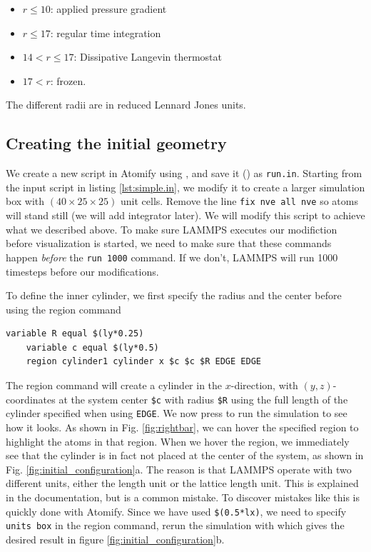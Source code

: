 \documentclass[aps,pre,twocolumn,letterpaper,floatfix,nofootinbib]{revtex4}
\newcommand{\code}[1]{\colorbox{light-gray}{\color{RawSienna}\texttt{#1}}}
\begin{document}
\begin{itemize}  
	\item $r \leq 10$: applied pressure gradient
	\item $r \leq 17$: regular time integration
	\item $14 < r \leq 17$: Dissipative Langevin thermostat
	\item $17 < r$: frozen.
\end{itemize}
The different radii are in reduced Lennard Jones units.

\subsection{Creating the initial geometry}
We create a new script in Atomify using , and save it () as \code{run.in}.
Starting from the input script in listing \ref{lst:simple.in}, we modify it to create a larger simulation box with $(40\times25\times25)$ unit cells.
Remove the line \code{fix nve all nve} so atoms will stand still (we will add integrator later).
We will modify this script to achieve what we described above. To make sure LAMMPS executes our modifiction before visualization is started, we need to make sure that these commands happen \textit{before} the \code{run 1000} command.
If we don't, LAMMPS will run 1000 timesteps before our modifications.

To define the inner cylinder, we first specify the radius and the center before using the region command
\begin{lstlisting}[basicstyle=\tiny, frame = none, numbers=none, framexleftmargin=0pt, xleftmargin=-0.75cm, xrightmargin=0.0cm]
	variable R equal $(ly*0.25)
	variable c equal $(ly*0.5)
	region cylinder1 cylinder x $c $c $R EDGE EDGE
\end{lstlisting}
The region command will create a cylinder in the $x$-direction, with $(y,z)$-coordinates at the system center \code{\$c} with radius \code{\$R} using the full length of the cylinder specified when using \code{EDGE}.
We now press  to run the simulation to see how it looks.
As shown in Fig. \ref{fig:rightbar}, we can hover the specified region to highlight the atoms in that region.
When we hover the region, we immediately see that the cylinder is in fact not placed at the center of the system, as shown in Fig. \ref{fig:initial_configuration}a.
The reason is that LAMMPS operate with two different units, either the length unit or the lattice length unit. This is explained in the documentation, but is a common mistake.
To discover mistakes like this is quickly done with Atomify.
Since we have used \code{\$(0.5*lx)}, we need to specify \code{units box} in the region command, rerun the simulation with  which gives the desired result in figure  \ref{fig:initial_configuration}b.
\end{document}

